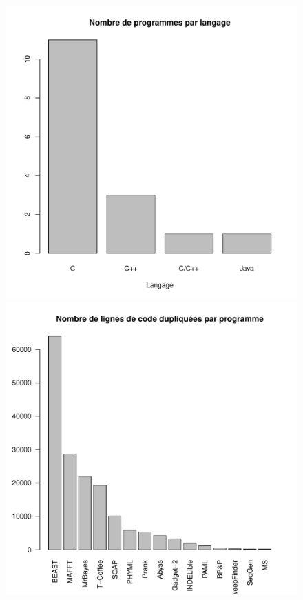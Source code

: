\begin{figure}[!h]
  \includegraphics[width=\linewidth]{figures/prog_lang.pdf}
  \caption{}\label{fig:prog_lang}
  \endminipage\hfill
  \includegraphics[width=\linewidth]{figures/dlin_prog.pdf}
  \caption{}\label{fig:dlin_prog}
  \endminipage\hfill
\end{figure}
